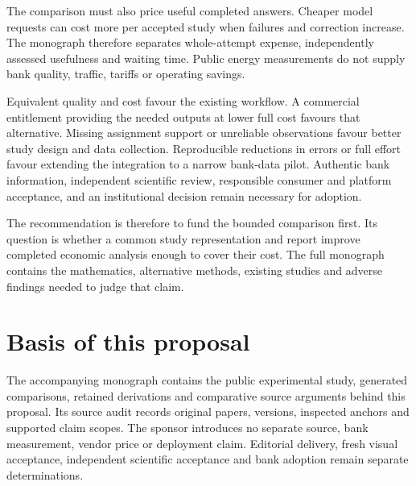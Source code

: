 The comparison must also price useful completed answers. Cheaper model
requests can cost more per accepted study when failures and correction
increase. The monograph therefore separates whole-attempt expense, independently
assessed usefulness and waiting time. Public energy measurements do not supply
bank quality, traffic, tariffs or operating savings.

Equivalent quality and cost favour the existing workflow. A commercial
entitlement providing the needed outputs at lower full cost favours that
alternative. Missing assignment support or unreliable observations favour
better study design and data collection. Reproducible reductions in errors
or full effort favour extending the integration to a narrow bank-data
pilot. Authentic bank information, independent scientific review, responsible
consumer and platform acceptance, and an institutional decision remain
necessary for adoption.

The recommendation is therefore to fund the bounded comparison first. Its
question is whether a common study representation and report improve
completed economic analysis enough to cover their cost. The full monograph
contains the mathematics, alternative methods, existing studies and adverse
findings needed to judge that claim.

\section*{Basis of this proposal}
The accompanying monograph contains the public experimental study, generated
comparisons, retained derivations and comparative source arguments behind this
proposal. Its source audit records original papers, versions, inspected
anchors and supported claim scopes. The sponsor introduces no separate source,
bank measurement, vendor price or deployment claim.
Editorial delivery, fresh visual acceptance, independent scientific
acceptance and bank adoption remain separate determinations.
